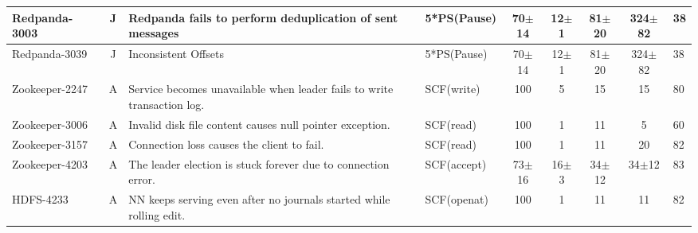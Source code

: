 \begin{table*}[t!]
\begin{tabular}{l|c|l|l|c|c|c|c|l}
		Redpanda-3003~\cite{redpanda3003}                                                                                           & J            & Redpanda fails to perform deduplication of sent messages                & 5*PS(Pause)                                                             & 70$\pm$14       & 12$\pm$1       & 81$\pm$20    & 324$\pm$82        & 38            \\ \hline
		Redpanda-3039~\cite{redpanda3039}                                                                                           & J            & Inconsistent Offsets                                                    & 5*PS(Pause)                                                             & 70$\pm$14       & 12$\pm$1       & 81$\pm$20    & 324$\pm$82        & 38            \\ \hline
		Zookeeper-2247~\cite{zookeeper2247}                                                                                         & A            & Service becomes unavailable when leader fails to write transaction log. & SCF(write)                                                              & 100             & 5              & 15           & 15                & 80            \\ \hline
		Zookeeper-3006~\cite{zookeeper3006}                                                                                         & A            & Invalid disk file content causes null pointer exception.                & SCF(read)                                                               & 100             & 1              & 11           & 5                 & 60            \\ \hline
		Zookeeper-3157~\cite{zookeeper3157}                                                                                         & A            & Connection loss causes the client to fail.                              & SCF(read)                                                               & 100             & 1              & 11           & 20                & 82            \\\hline
		Zookeeper-4203~\cite{zookeeper4203}                                                                                         & A            & The leader election is stuck forever due to connection error.           & SCF(accept)                                                             & 73$\pm$16       & 16$\pm$3       & 34$\pm$12    & 34$\pm$12         & 83            \\ \hline
		HDFS-4233~\cite{hdfs4233}                                                                                                   & A            & NN keeps serving even after no journals started while rolling edit.     & SCF(openat)                                                             & 100             & 1              & 11           & 11                & 82            \\ \hline

\end{tabular}
\end{table*}
